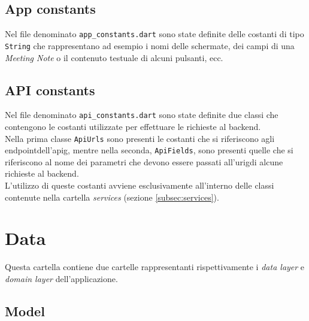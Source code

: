 \subsection{App constants}
\label{subsec:app-constants}

Nel file denominato \lstinline{app_constants.dart} sono state definite delle costanti di tipo \lstinline{String} che rappresentano ad esempio i nomi delle schermate, dei campi di una \emph{Meeting Note} o il contenuto testuale di alcuni pulsanti, ecc.

\subsection{API constants}
\label{subsec:api-constants}

Nel file denominato \lstinline{api_constants.dart} sono state definite due classi che contengono le costanti utilizzate per effettuare le richieste al \gls{backend}\glsoccur.\\
Nella prima classe \lstinline{ApiUrls} sono presenti le costanti che si riferiscono agli \gls{endpoint}\glsoccur dell'\gls{apig}\glsoccur, mentre nella seconda, \lstinline{ApiFields}, sono presenti quelle che si riferiscono al nome dei parametri che devono essere passati all'\gls{urig}\glsoccur di alcune richieste al \gls{backend}\glsoccur. \\
L'utilizzo di queste costanti avviene esclusivamente all'interno delle classi contenute nella cartella \emph{services} (sezione \ref{subsec:services}).

\section{Data}
\label{sec:data}

Questa cartella contiene due cartelle rappresentanti rispettivamente i \emph{data layer} e \emph{domain layer} dell'applicazione.

\subsection{Model}
\label{subsec:model}


